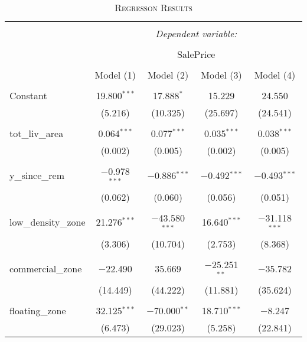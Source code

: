 \documentclass[a4paper]{article}
\begin{document}
\begin{table}[!htbp] \centering
\begin{adjustwidth}{-0.0cm}{-0cm}
\begin{threeparttable}
\small
\captionsetup{font=small, justification=raggedright,singlelinecheck=false}
\caption{\textsc{Regresson Results}}
\centering 
  \label{}
\begin{tabular}{@{\extracolsep{1pt}}lcccc} 
\\[-5.8ex]\hline 
\hline \\[-1.8ex] 
 & \multicolumn{4}{c}{\textit{Dependent variable:}} \\ 
\cline{2-5} 
\\[-1.8ex] & \multicolumn{4}{c}{SalePrice} \\ 
\\[-1.8ex] & Model (1) & Model (2) & Model (3) & Model (4)\\ 
\hline \\[-1.8ex] 
 Constant & 19.800$^{***}$ & 17.888$^{*}$ & 15.229 & 24.550 \\ 
  & (5.216) & (10.325) & (25.697) & (24.541) \\ 
  & & & & \\ 
 tot\_liv\_area & 0.064$^{***}$ & 0.077$^{***}$ & 0.035$^{***}$ & 0.038$^{***}$ \\ 
  & (0.002) & (0.005) & (0.002) & (0.005) \\ 
  & & & & \\ 
 y\_since\_rem & $-$0.978$^{***}$ & $-$0.886$^{***}$ & $-$0.492$^{***}$ & $-$0.493$^{***}$ \\ 
  & (0.062) & (0.060) & (0.056) & (0.051) \\ 
  & & & & \\ 
 low\_density\_zone & 21.276$^{***}$ & $-$43.580$^{***}$ & 16.640$^{***}$ & $-$31.118$^{***}$ \\ 
  & (3.306) & (10.704) & (2.753) & (8.368) \\ 
  & & & & \\ 
 commercial\_zone & $-$22.490 & 35.669 & $-$25.251$^{**}$ & $-$35.782 \\ 
  & (14.449) & (44.222) & (11.881) & (35.624) \\ 
  & & & & \\ 
 floating\_zone & 32.125$^{***}$ & $-$70.000$^{**}$ & 18.710$^{***}$ & $-$8.247 \\ 
  & (6.473) & (29.023) & (5.258) & (22.841) \\ 

\end{tabular}
\end{threeparttable}
\end{adjustwidth}
\end{table}
\end{document}
